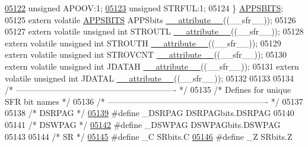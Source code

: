\begin{DoxyCode}
\hypertarget{a00009_source_l05122}{}\hyperlink{a00008_ac2f8a4bb97218ac7682ddbe3561a04aa}{05122}   \textcolor{keywordtype}{unsigned} APOOV:1;
\hypertarget{a00009_source_l05123}{}\hyperlink{a00008_a6905c1b3f59b4b718e36adffa521659b}{05123}   \textcolor{keywordtype}{unsigned} STRFUL:1;
05124 \} \hyperlink{a00008_d1/dd6/a00108}{APPSBITS};
05125 \textcolor{keyword}{extern} \textcolor{keyword}{volatile} \hyperlink{a00008_d1/dd6/a00108}{APPSBITS} APPSbits \hyperlink{a00009_a493c46f03454991ccc5aa7a6e1dfb2a7}{\_\_attribute\_\_}((\_\_sfr\_\_));
05126 
05127 \textcolor{keyword}{extern} \textcolor{keyword}{volatile} \textcolor{keywordtype}{unsigned} \textcolor{keywordtype}{int}  STROUTL \hyperlink{a00009_a493c46f03454991ccc5aa7a6e1dfb2a7}{\_\_attribute\_\_}((\_\_sfr\_\_));
05128 \textcolor{keyword}{extern} \textcolor{keyword}{volatile} \textcolor{keywordtype}{unsigned} \textcolor{keywordtype}{int}  STROUTH \hyperlink{a00009_a493c46f03454991ccc5aa7a6e1dfb2a7}{\_\_attribute\_\_}((\_\_sfr\_\_));
05129 \textcolor{keyword}{extern} \textcolor{keyword}{volatile} \textcolor{keywordtype}{unsigned} \textcolor{keywordtype}{int}  STROVCNT \hyperlink{a00009_a493c46f03454991ccc5aa7a6e1dfb2a7}{\_\_attribute\_\_}((\_\_sfr\_\_));
05130 \textcolor{keyword}{extern} \textcolor{keyword}{volatile} \textcolor{keywordtype}{unsigned} \textcolor{keywordtype}{int}  JDATAH \hyperlink{a00009_a493c46f03454991ccc5aa7a6e1dfb2a7}{\_\_attribute\_\_}((\_\_sfr\_\_));
05131 \textcolor{keyword}{extern} \textcolor{keyword}{volatile} \textcolor{keywordtype}{unsigned} \textcolor{keywordtype}{int}  JDATAL \hyperlink{a00009_a493c46f03454991ccc5aa7a6e1dfb2a7}{\_\_attribute\_\_}((\_\_sfr\_\_));
05132 
05133 
05134 \textcolor{comment}{/* ---------------------------------------------------------- */}
05135 \textcolor{comment}{/* Defines for unique SFR bit names                           */}
05136 \textcolor{comment}{/* ---------------------------------------------------------- */}
05137 
05138 \textcolor{comment}{/* DSRPAG */}
\hypertarget{a00009_source_l05139}{}\hyperlink{a00009_ab8211a5e1c9536ac12831224f03ab270}{05139} \textcolor{preprocessor}{#define \_DSRPAG DSRPAGbits.DSRPAG}
05140 
05141 \textcolor{comment}{/* DSWPAG */}
\hypertarget{a00009_source_l05142}{}\hyperlink{a00009_a6e44b92d3c190e7c1fd9380a2d29683c}{05142} \textcolor{preprocessor}{#define \_DSWPAG DSWPAGbits.DSWPAG}
05143 
05144 \textcolor{comment}{/* SR */}
\hypertarget{a00009_source_l05145}{}\hyperlink{a00009_a6979fbabd6378fb160ac676f18dff927}{05145} \textcolor{preprocessor}{#define \_C SRbits.C}
\hypertarget{a00009_source_l05146}{}\hyperlink{a00009_aa73b64c328f03645b51ee9bf5ce73640}{05146} \textcolor{preprocessor}{#define \_Z SRbits.Z}

\end{DoxyCode}
